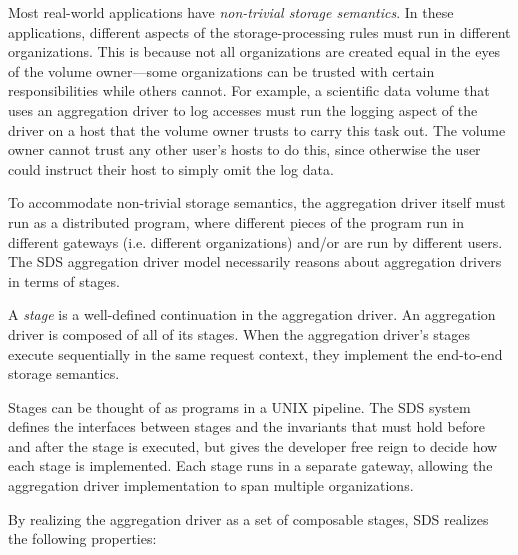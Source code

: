 Most real-world applications have \emph{non-trivial storage semantics}.  In these
applications, different aspects of the storage-processing rules must run in different
organizations.  This is because not all organizations are created equal in the
eyes of the volume owner---some
organizations can be trusted with certain responsibilities while others cannot.
For example, a scientific data volume that uses an aggregation
driver to log accesses must run the logging aspect of the driver on a host that the volume
owner trusts to carry this task out.  The volume owner cannot trust any other
user's hosts to do this, since otherwise the user could instruct their host
to simply omit the log data.

To accommodate non-trivial storage semantics, the aggregation driver itself must
run as a distributed program, where different pieces of the program run in
different gateways (i.e. different organizations) and/or are run by different
users.  The SDS aggregation driver model necessarily reasons about aggregation
drivers in terms of stages.

A \emph{stage} is a well-defined continuation in the aggregation driver.  An
aggregation driver is composed of all of its stages.  When
the aggregation driver's stages execute sequentially in the same request
context, they implement the end-to-end storage semantics.

Stages can be thought of as programs in a UNIX pipeline.
The SDS system defines the interfaces between stages
and the invariants that must hold before and after the stage is executed,
but gives the developer free reign to decide how each stage is implemented.
Each stage runs in a separate gateway, allowing the aggregation driver
implementation to span multiple organizations.

By realizing the aggregation driver as a set of composable stages, SDS realizes
the following properties:

